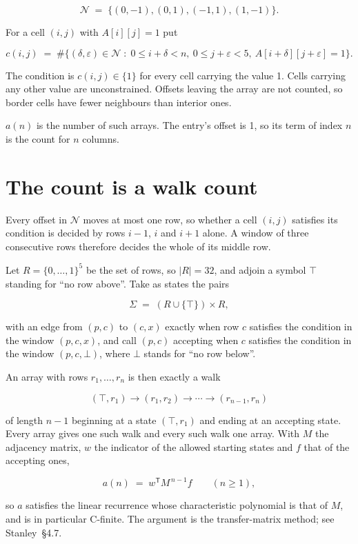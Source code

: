 \documentclass[11pt]{article}
\theoremstyle{definition}
\begin{document}
\[\mathcal{N} \;=\; \{(0,-1), (0,1), (-1,1), (1,-1)\}.\]

For a cell $(i,j)$ with $A[i][j] = 1$ put

\[c(i,j) \;=\; \#\bigl\{(\delta,\varepsilon)\in\mathcal{N} \;:\; 0\le i+\delta<n,\ 0\le j+\varepsilon<5,\ A[i+\delta][j+\varepsilon] = 1\bigr\}.\]

The condition is $c(i,j) \in \{1\}$ for every cell carrying the value 1. Cells carrying any other value are unconstrained. Offsets leaving the array are not counted, so border cells have fewer neighbours than interior ones.

$a(n)$ is the number of such arrays. The entry's offset is 1, so its term of index $n$ is the count for $n$ columns.

\section{The count is a walk count}

Every offset in $\mathcal{N}$ moves at most one row, so whether a cell $(i,j)$ satisfies its condition is decided by rows $i-1$, $i$ and $i+1$ alone. A window of three consecutive rows therefore decides the whole of its middle row.

Let $R = \{0,\dots,1\}^{5}$ be the set of rows, so $|R| = 32$, and adjoin a symbol $\top$ standing for ``no row above''. Take as states the pairs

\[\Sigma \;=\; (R \cup \{\top\}) \times R,\]

with an edge from $(p,c)$ to $(c,x)$ exactly when row $c$ satisfies the condition in the window $(p,c,x)$, and call $(p,c)$ accepting when $c$ satisfies the condition in the window $(p,c,\bot)$, where $\bot$ stands for ``no row below''.

An array with rows $r_1,\dots,r_n$ is then exactly a walk

\[(\top,r_1) \to (r_1,r_2) \to \cdots \to (r_{n-1},r_n)\]

of length $n-1$ beginning at a state $(\top,r_1)$ and ending at an accepting state. Every array gives one such walk and every such walk one array. With $M$ the adjacency matrix, $w$ the indicator of the allowed starting states and $f$ that of the accepting ones,

\[a(n) \;=\; w^{\mathsf T} M^{\,n-1} f \qquad (n \ge 1),\]

so $a$ satisfies the linear recurrence whose characteristic polynomial is that of $M$, and is in particular C-finite. The argument is the transfer-matrix method; see Stanley~\S4.7.
\end{document}
